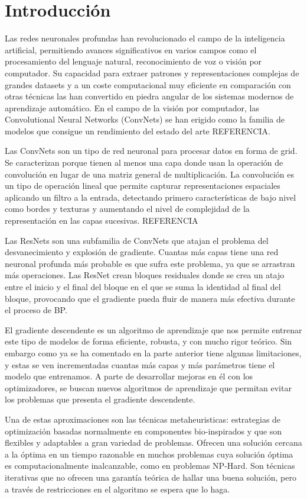 \section{Introducción}

Las redes neuronales profundas han revolucionado el campo de la inteligencia artificial, permitiendo avances significativos en varios campos como el procesamiento del lenguaje natural, reconocimiento de voz o visión por computador. Su capacidad para extraer patrones y representaciones complejas de grandes datasets y a un coste computacional muy eficiente en comparación con otras técnicas las han convertido en piedra angular de los sistemas modernos de aprendizaje automático. En el campo de la visión por computador, las Convolutional Neural Networks (ConvNets) se han erigido como la familia de modelos que consigue un rendimiento del estado del arte REFERENCIA.

Las ConvNets son un tipo de red neuronal para procesar datos en forma de grid. Se caracterizan porque tienen al menos una capa donde usan la operación de convolución en lugar de una matriz general de multiplicación. La convolución es un tipo de operación lineal que permite capturar representaciones espaciales aplicando un filtro a la entrada, detectando primero características de bajo nivel como bordes y texturas y aumentando el nivel de complejidad de la representación en las capas sucesivas. REFERENCIA

Las ResNets son una subfamilia de ConvNets que atajan el problema del desvanecimiento y explosión de gradiente. Cuantas más capas tiene una red neuronal profunda más probable es que sufra este problema, ya que se arrastran más operaciones. Las ResNet crean bloques residuales donde se crea un atajo entre el inicio y el final del bloque en el que se suma la identidad al final del bloque, provocando que el gradiente pueda fluir de manera más efectiva durante el proceso de BP.

El gradiente descendente es un algoritmo de aprendizaje que nos permite entrenar este tipo de modelos de forma eficiente, robusta, y con mucho rigor teórico. Sin embargo como ya se ha comentado en la parte anterior tiene algunas limitaciones, y estas se ven incrementadas cuantas más capas y más parámetros tiene el modelo que entrenamos. A parte de desarrollar mejoras en él con los optimizadores, se buscan nuevos algoritmos de aprendizaje que permitan evitar los problemas que presenta el gradiente descendente.

Una de estas aproximaciones son las técnicas metaheuristicas: estrategias de optimización basadas normalmente en componentes bio-inspirados y que son flexibles y adaptables a gran variedad de problemas. Ofrecen una solución cercana a la óptima en un tiempo razonable en muchos problemas cuya solución óptima es computacionalmente inalcanzable, como en problemas NP-Hard. Son técnicas iterativas que no ofrecen una garantía teórica de hallar una buena solución, pero a través de restricciones en el algoritmo se espera que lo haga.

